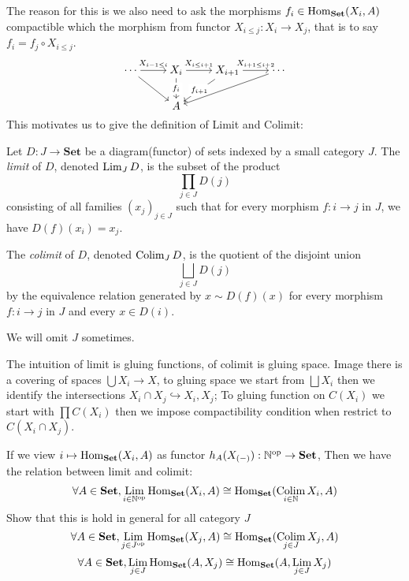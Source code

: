 The reason for this is we also need to ask the morphisms $ f_i \in \mathrm{Hom}_{\mathbf{Set}}(X_i , A)$ compactible which the morphism from functor $X_{i\leq j}:X_i\to X_{j}$, that is to say $f_i = f_j \circ X_{i\leq j}$.
\[\begin{tikzcd}[ampersand replacement=\&,cramped]
	\cdots \& {X_i} \& {X_{i+1}} \& \cdots \\
	\& A
	\arrow["{X_{i-1\leq i}}", from=1-1, to=1-2]
	\arrow[from=1-1, to=2-2]
	\arrow["{X_{i\leq i+1}}", from=1-2, to=1-3]
	\arrow["{f_i}"{description}, from=1-2, to=2-2]
	\arrow["{X_{i+1\leq i+2}}", from=1-3, to=1-4]
	\arrow["{f_{i+1}}"{description}, from=1-3, to=2-2]
	\arrow[from=1-4, to=2-2]
\end{tikzcd}\]
This motivates us to give the definition of Limit and Colimit:
\begin{definition}
  Let $D : J \to \mathbf{Set}$ be a diagram(functor) of sets indexed by a small category $J$. The \emph{limit} of $D$, denoted $\operatorname*{\mathrm{Lim}}_J D$, is the subset of the product
\[
\prod_{j \in J} D(j)
\]
consisting of all families $(x_j)_{j \in J}$ such that for every morphism $f : i \to j$ in $J$, we have $D(f)(x_i) = x_j$.

The \emph{colimit} of $D$, denoted $\operatorname*{\mathrm{Colim}}_J D$, is the quotient of the disjoint union
\[
\bigsqcup_{j \in J} D(j)
\]
by the equivalence relation generated by $x \sim D(f)(x)$ for every morphism $f : i \to j$ in $J$ and every $x \in D(i)$.
\end{definition}
We will omit $J$ sometimes.
\begin{remark}
 The intuition of limit is gluing functions, of colimit is gluing space. Image there is a covering of spaces $\bigcup X_i\to X$, to gluing space we start from $\bigsqcup X_i$ then we identify the intersections $X_i\cap X_j\hookrightarrow X_i,X_j$; To gluing function on $C(X_i)$ we start with $\prod C(X_i)$ then we impose compactibility condition when restrict to $C(X_i\cap X_j)$.
\end{remark}
\begin{exercise}
  If we view  $i \mapsto \mathrm{Hom}_{\mathbf{Set}}(X_i , A)$ as functor $ h_A(X_{(-)}): \mathbb{N}^{\mathrm{op}} \to \mathbf{Set} $, Then we have the relation between limit and colimit:
\[
  \forall A\in \mathbf{Set}, \operatorname*{\mathrm{Lim}}_{i\in \mathbb{N}^{\mathrm{op}}} \mathrm{Hom}_{\mathbf{Set}}(X_i , A) \cong \mathrm{Hom}_{\mathbf{Set}}(\operatorname*{\mathrm{Colim}}_{i\in \mathbb{N}} X_i, A)
\]
Show that this is hold in general for all category $J$
\[
  \forall A\in \mathbf{Set}, \operatorname*{\mathrm{Lim}}_{j\in J^{\mathrm{op}}} \mathrm{Hom}_{\mathbf{Set}}(X_j , A) \cong \mathrm{Hom}_{\mathbf{Set}}(\operatorname*{\mathrm{Colim}}_{j\in J} X_j, A)
\]
\[
  \forall A\in \mathbf{Set}, \operatorname*{\mathrm{Lim}}_{j\in J} \mathrm{Hom}_{\mathbf{Set}}(A, X_j ) \cong \mathrm{Hom}_{\mathbf{Set}}(A, \operatorname*{\mathrm{Lim}}_{j\in J} X_j)
\]
\end{exercise}
